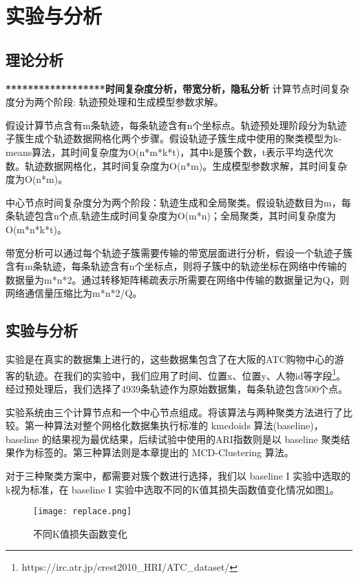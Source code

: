 \section{实验与分析}

\subsection{理论分析}

\textbf{******************时间复杂度分析，带宽分析，隐私分析}
计算节点时间复杂度分为两个阶段: 轨迹预处理和生成模型参数求解。

假设计算节点含有m条轨迹，每条轨迹含有n个坐标点。轨迹预处理阶段分为轨迹子簇生成个轨迹数据网格化两个步骤。假设轨迹子簇生成中使用的聚类模型为k-means算法，其时间复杂度为O(n*m*k*t)，其中k是簇个数，t表示平均迭代次数。轨迹数据网格化，其时间复杂度为O(n*m)。生成模型参数求解，其时间复杂度为O(n*m)。

中心节点时间复杂度分为两个阶段：轨迹生成和全局聚类。假设轨迹数目为m，每条轨迹包含n个点,轨迹生成时间复杂度为O(m*n)；全局聚类，其时间复杂度为O(m*n*k*t)。

带宽分析可以通过每个轨迹子簇需要传输的带宽层面进行分析，假设一个轨迹子簇含有m条轨迹，每条轨迹含有n个坐标点，则将子簇中的轨迹坐标在网络中传输的数据量为m*n*2。通过转移矩阵稀疏表示所需要在网络中传输的数据量记为Q，则网络通信量压缩比为m*n*2/Q。

\subsection{实验与分析}
实验是在真实的数据集上进行的，这些数据集包含了在大阪的ATC购物中心的游客的轨迹。在我们的实验中，我们应用了时间、位置x、位置y、人物id等字段\footnote[1]{https://irc.atr.jp/crest2010_HRI/ATC_dataset/}。经过预处理后，我们选择了4939条轨迹作为原始数据集，每条轨迹包含500个点。

实验系统由三个计算节点和一个中心节点组成。将该算法与两种聚类方法进行了比较。第一种算法对整个网格化数据集执行标准的 kmedoids 算法(baseline)， baseline 的结果视为最优结果，后续试验中使用的ARI指数则是以 baseline 聚类结果作为标签的。第三种算法则是本章提出的 MCD-Clustering 算法。

对于三种聚类方案中，都需要对簇个数进行选择，我们以 baseline I 实验中选取的k视为标准，在 baseline I 实验中选取不同的K值其损失函数值变化情况如图\ref{differentK}。
\begin{figure}[h]
	\texttt{[image: replace.png]}
	\caption{不同K值损失函数变化}
	\label{differentK}
\end{figure}

